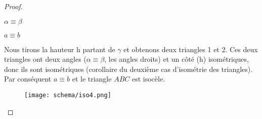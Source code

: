 \documentclass[a4paper,12pt]{article}
\begin{document}
\begin{proof}
\begin{enumerate}
    \begin{hyp}
     $\alpha \equiv \beta$
    \end{hyp}
    \begin{concl}
     $a\equiv b$
    \end{concl}
    Nous tirons la hauteur h partant de $\gamma$ et obtenons deux triangles 1 et 2. Ces deux triangles ont deux angles ($\alpha \equiv \beta$, les angles droits) et un côté (h) isométriques, donc ils sont isométriques (corollaire du deuxième cas d'isométrie des triangles). Par conséquent $a\equiv b$ et le triangle $ABC$ est isocèle.
    
    \begin{figure}[H]
        \centering
        \texttt{[image: schema/iso4.png]}
    \end{figure}
    
\end{enumerate}
\end{proof}
\end{document}
